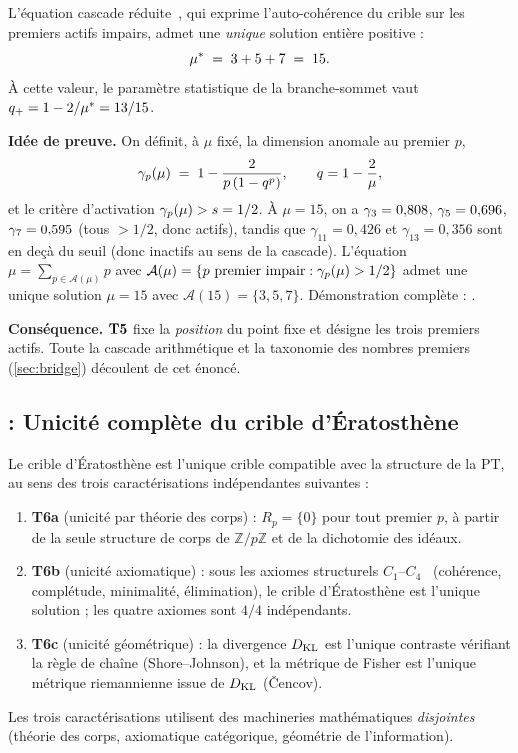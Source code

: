 \begin{theoreme}
\label{thm:T5}
L'équation cascade réduite~\cite[ch.~08, éq.~(8.3)]{PT_Monograph}, qui exprime l'auto-cohérence du crible sur les premiers actifs impairs, admet une \emph{unique} solution entière positive :
\[
\mu^{*} \;=\; 3 + 5 + 7 \;=\; 15.
\]
À cette valeur, le paramètre statistique de la branche-sommet vaut $q_{+} = 1 - 2/\mu^{*} = 13/15$.
\end{theoreme}

\textbf{Idée de preuve.} On définit, à $\mu$ fixé, la dimension anomale au premier $p$,
\[
\gamma_{p}(\mu) \;=\; 1 - \dfrac{2}{p\,(1 - q^{p})}, \qquad q = 1 - \dfrac{2}{\mu},
\]
et le critère d'activation $\gamma_{p}(\mu) > s = 1/2$. À $\mu = 15$, on a $\gamma_{3} = 0{,}808$, $\gamma_{5} = 0{,}696$, $\gamma_{7} = 0{,}595$ (tous $> 1/2$, donc actifs), tandis que $\gamma_{11} = 0{,}426$ et $\gamma_{13} = 0{,}356$ sont en deçà du seuil (donc inactifs au sens de la cascade). L'équation $\mu = \sum_{p \in \mathcal A(\mu)} p$ avec $\mathcal A(\mu) = \{p \text{ premier impair} : \gamma_{p}(\mu) > 1/2\}$ admet une unique solution $\mu = 15$ avec $\mathcal A(15) = \{3, 5, 7\}$. Démonstration complète : \cite[ch.~08]{PT_Monograph}.

\textbf{Conséquence.} $\textbf{T5}$ fixe la \emph{position} du point fixe et désigne les trois premiers actifs. Toute la cascade arithmétique et la taxonomie des nombres premiers (\ref{sec:bridge}) découlent de cet énoncé.

\subsection{\Tsix{} : Unicité complète du crible d'Ératosthène}
\label{sec:theoremes:T6}

\begin{theoreme}
\label{thm:T6}
Le crible d'Ératosthène est l'unique crible compatible avec la structure de la PT, au sens des trois caractérisations indépendantes suivantes :
\begin{enumerate}[nosep,label=\textup{(\arabic*)}]
\item \textbf{T6a} (unicité par théorie des corps) : $R_p = \{0\}$ pour tout premier $p$, à partir de la seule structure de corps de $\mathbb{Z}/p\mathbb{Z}$ et de la dichotomie des idéaux.
\item \textbf{T6b} (unicité axiomatique) : sous les axiomes structurels $C_1$--$C_4$~\cite[ch.~02]{PT_Monograph} (cohérence, complétude, minimalité, élimination), le crible d'Ératosthène est l'unique solution ; les quatre axiomes sont $4/4$ indépendants.
\item \textbf{T6c} (unicité géométrique) : la divergence $D_{\rm KL}$ est l'unique contraste vérifiant la règle de chaîne (Shore--Johnson), et la métrique de Fisher est l'unique métrique riemannienne issue de $D_{\rm KL}$ (\v{C}encov).
\end{enumerate}
Les trois caractérisations utilisent des machineries mathématiques \emph{disjointes} (théorie des corps, axiomatique catégorique, géométrie de l'information).
\end{theoreme}

